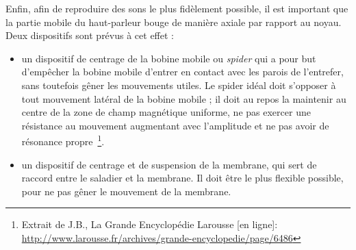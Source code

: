 Enfin, afin de reproduire des sons le plus fidèlement possible, il est important que la partie mobile du haut-parleur bouge de manière axiale par rapport au noyau.
Deux dispositifs sont prévus à cet effet \cite{Larousse} : 
\begin{itemize}
\item un dispositif de centrage de la bobine mobile ou \textit{spider} qui \og a pour but d’empêcher la bobine mobile d’entrer en contact avec les parois de l’entrefer, sans toutefois gêner les mouvements utiles. Le spider idéal doit s’opposer à tout mouvement latéral de la bobine mobile ; il doit au repos la maintenir au centre de la zone de champ magnétique uniforme, ne pas exercer une résistance au mouvement augmentant avec l’amplitude et ne pas avoir de résonance propre~\footnote{Extrait de J.B., \og La Grande Encyclopédie Larousse [en ligne]\fg : \url{http://www.larousse.fr/archives/grande-encyclopedie/page/6486}}.\fg 
\item un dispositif de centrage et de suspension de la membrane, qui sert de raccord entre le saladier et la membrane. Il doit être le plus flexible possible, pour ne pas gêner le mouvement de la membrane.
\end{itemize}






